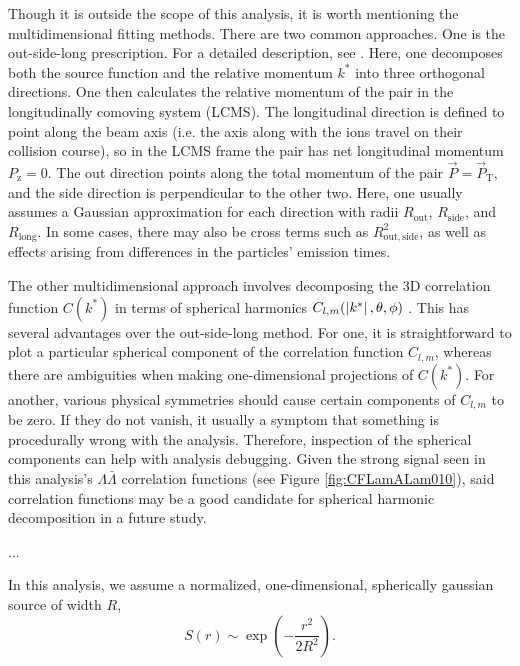Though it is outside the scope of this analysis, it is worth mentioning the multidimensional fitting methods.
There are two common approaches.
One is the out-side-long prescription.
For a detailed description, see \cite{Lisa:2005dd}.
Here, one decomposes both the source function and the relative momentum $k^*$ into three orthogonal directions.
One then calculates the relative momentum of the pair in the longitudinally comoving system (LCMS).
The longitudinal direction is defined to point along the beam axis (i.e. the axis along with the ions travel on their collision course), so in the LCMS frame the pair has net longitudinal momentum $P_\mathrm{z} = 0$.
The out direction points along the total momentum of the pair $\vec{P}=\vec{P}_{\mathrm{T}}$, and the side direction is perpendicular to the other two.
Here, one usually assumes a Gaussian approximation for each direction with radii $R_\mathrm{out}$, $R_\mathrm{side}$, and $R_\mathrm{long}$.
In some cases, there may also be cross terms such as $R^2_{\mathrm{out,side}}$, as well as effects arising from differences in the particles' emission times.

The other multidimensional approach involves decomposing the 3D correlation function $C(k^*)$ in terms of spherical harmonics $C_{l,m}(\left\lvert k^*\right\rvert,\theta, \phi)$ \cite{Chajecki:2008vg}.
This has several advantages over the out-side-long method.
For one, it is straightforward to plot a particular spherical component of the correlation function $C_{l,m}$, whereas there are ambiguities when making one-dimensional projections of $C(k^*)$.
For another, various physical symmetries should cause certain components of $C_{l,m}$ to be zero.
If they do not vanish, it usually a symptom that something is procedurally wrong with the analysis.
Therefore, inspection of the spherical components can help with analysis debugging.
Given the strong signal seen in this analysis's $\Lambda\bar{\Lambda}$ correlation functions (see Figure \ref{fig:CFLamALam010}), said correlation functions may be a good candidate for spherical harmonic decomposition in a future study.

...

In this analysis, we assume a normalized, one-dimensional, spherically gaussian source of width $R$,
\begin{equation}
S(r) \sim \exp{(-\frac{r^2}{2R^2})}.
\end{equation}



 
